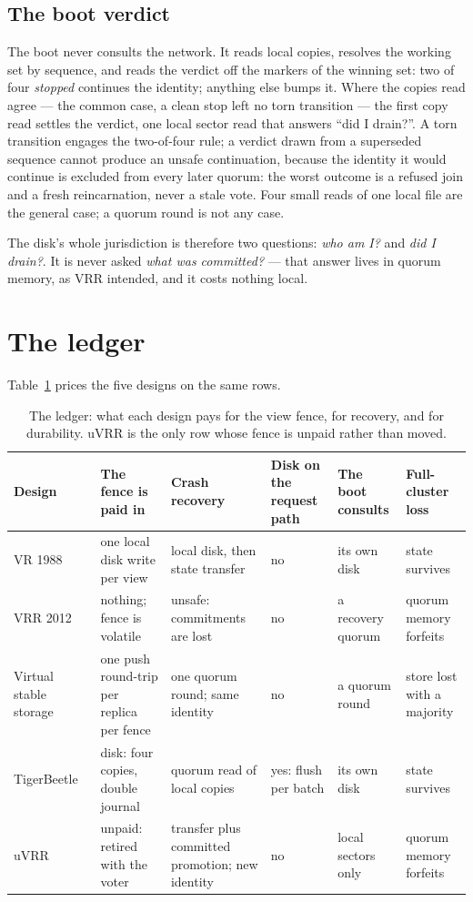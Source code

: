 \documentclass[10pt,journal,letterpaper]{IEEEtran}
\begin{document}
\subsection{The boot verdict}
The boot never consults the network.
It reads local copies, resolves the working set by sequence, and reads the
verdict off the markers of the winning set: two of four \emph{stopped}
continues the identity; anything else bumps it.
Where the copies read agree --- the common case, a clean stop left no torn
transition --- the first copy read settles the verdict, one local sector read
that answers ``did I drain?''.
A torn transition engages the two-of-four rule; a verdict drawn from a
superseded sequence cannot produce an unsafe continuation, because the
identity it would continue is excluded from every later quorum: the worst
outcome is a refused join and a fresh reincarnation, never a stale vote.
Four small reads of one local file are the general case; a quorum round is
not any case.

The disk's whole jurisdiction is therefore two questions: \emph{who am I?}
and \emph{did I drain?}.
It is never asked \emph{what was committed?} --- that answer lives in quorum
memory, as VRR intended, and it costs nothing local.

\section{The ledger}\label{sec:ledger}
Table~\ref{tab:ledger} prices the five designs on the same rows.

\begin{table}[t]
\centering
\footnotesize
\caption{The ledger: what each design pays for the view fence, for recovery, and for durability. uVRR is the only row whose fence is unpaid rather than moved.}
\label{tab:ledger}
\begin{tabular}{@{}p{2.2cm}p{3.2cm}p{3.4cm}p{2.0cm}p{2.3cm}p{2.5cm}@{}}
\toprule
Design & The fence is paid in & Crash recovery & Disk on the request path & The boot consults & Full-cluster loss \\
\midrule
VR 1988~\cite{vr} & one local disk write per view & local disk, then state transfer & no & its own disk & state survives \\
VRR 2012~\cite{vrr} & nothing; fence is volatile & unsafe: commitments are lost~\cite{diskless} & no & a recovery quorum & quorum memory forfeits \\
Virtual stable storage~\cite{diskless} & one push round-trip per replica per fence & one quorum round; same identity & no & a quorum round & store lost with a majority \\
TigerBeetle~\cite{tigerbeetle} & disk: four copies, double journal & quorum read of local copies & yes: flush per batch & its own disk & state survives \\
uVRR & unpaid: retired with the voter & transfer plus committed promotion; new identity & no & local sectors only & quorum memory forfeits \\
\bottomrule
\end{tabular}
\end{table}
\end{document}
